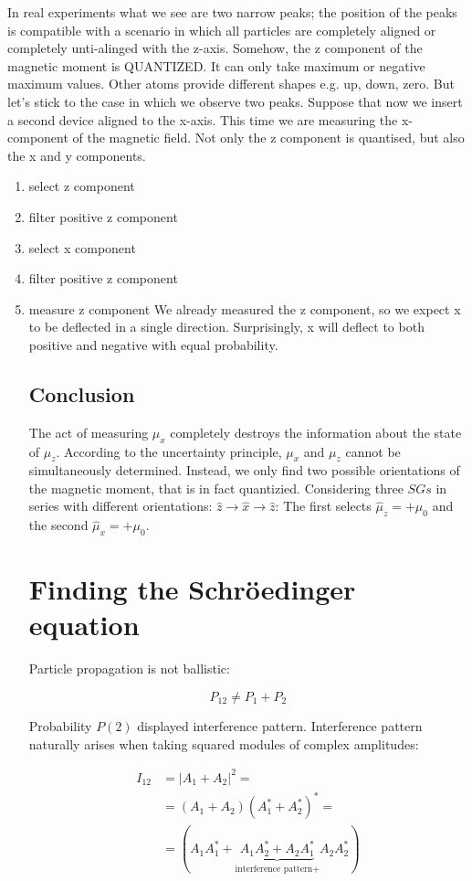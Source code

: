 In real experiments what we see are two narrow peaks; the position of the peaks is compatible with a scenario in which all particles are completely aligned or completely unti-alinged with the z-axis. Somehow, the z component of the magnetic moment is QUANTIZED. It can only take maximum or negative maximum values. Other atoms provide different shapes e.g. up, down, zero. But let’s stick to the case in which we observe two peaks.
Suppose that now we insert a second device aligned to the x-axis. This time we are measuring the x-component of the magnetic field. Not only the z component is quantised, but also the x and y components.
\begin{enumerate}
  \item select z component
  \item filter positive z component
  \item select x component
  \item filter positive z component
  \item measure z component
We already measured the z component, so we expect x to be deflected in a single direction. Surprisingly, x will deflect to both positive and negative with equal probability. 

  \subsection{Conclusion}
  The act of measuring $\mu_x$ completely destroys the information about the state of $\mu_z$.
  According to the uncertainty principle, $\mu_x$ and $\mu_z$ cannot be simultaneously determined.
  Instead, we only find two possible orientations of the magnetic moment, that is in fact quantizied.
  Considering three $SGs$ in series with different orientations: $\hat{z}\rightarrow\hat{x}\rightarrow\hat{z}$:
  The first selects $\hat{\mu}_z = +\mu_0$ and the second $\hat{\mu}_x = +\mu_0$.

\section{Finding the Schr\"oedinger equation}
Particle propagation is not ballistic:

$$P_{12} \neq P_1 + P_2$$

Probability $P(2)$ displayed interference pattern.
Interference pattern naturally arises when taking squared modules of complex amplitudes:

\begin{align*}
  I_{12} &= |A_1 + A_2|^2=\\
         &=(A_1 + A_2)(A_1^*+A_2^*)^*=\\
         &=(A_1A_1^*+\underbrace{A_1A_2^*+A_2A_1^*}_{\text{interference pattern+}}A_2A_2^*)
\end{align*}



\end{enumerate}
